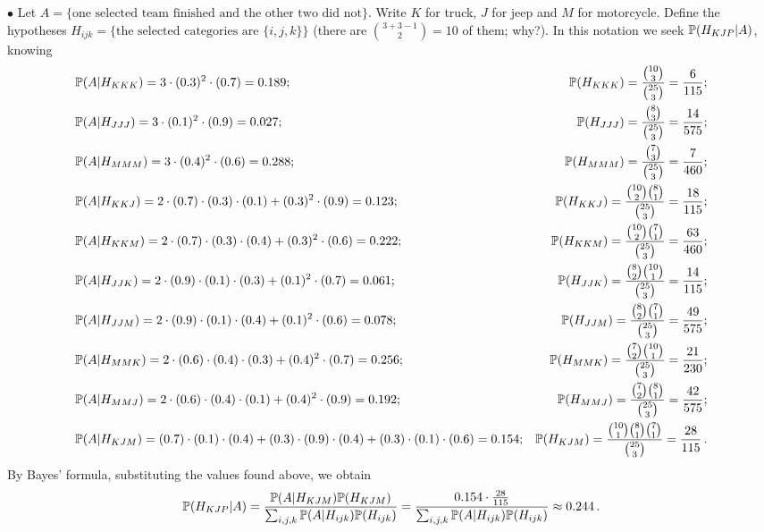 \documentclass[a4paper]{report}
\begin{document}
$\bullet$ Let $A=\{\text{one selected team finished and the other two did not}\}$.
Write $K$ for truck, $J$ for jeep and $M$ for motorcycle. Define the hypotheses
$H_{ijk}=\{\text{the selected categories are }\{i,j,k\}\}$ (there are $\binom{3+3-1}{2}=10$ of them; why?). In this notation we seek $\P(H_{KJP}|A)$, knowing
\begingroup\small
\begin{align*}
   &\P(A|H_{KKK}) = 3 \cdot (0.3)^2 \cdot (0.7) = 0.189;  &\P(H_{KKK}) =
   \frac{\binom{10}{3}}{\binom{25}{3}} = \frac{6}{115};\\%
   &\P(A|H_{JJJ}) = 3 \cdot (0.1)^2  \cdot (0.9)= 0.027; &\P(H_{JJJ}) =
   \frac{\binom{8}{3}}{\binom{25}{3}}= \frac{14}{575};\\%
   &\P(A|H_{MMM}) = 3 \cdot (0.4)^2 \cdot (0.6) = 0.288; &\P(H_{MMM}) =\frac{\binom{7}{3}}{\binom{25}{3}}= \frac{7}{460};\\
   &\P(A|H_{KKJ}) = 2\cdot(0.7)\cdot(0.3)\cdot(0.1)
   + (0.3)^2\cdot(0.9) = 0.123; &\P(H_{KKJ}) = \frac{\binom{10}{2}\binom{8}{1}}{\binom{25}{3}}
   =\frac{18}{115}; \\
      &\P(A|H_{KKM}) = 2\cdot(0.7)\cdot(0.3)\cdot(0.4)
   + (0.3)^2\cdot(0.6)=0.222; &\P(H_{KKM}) = \frac{\binom{10}{2}\binom{7}{1}}{\binom{25}{3}}
   = \frac{63}{460}; \\
      &\P(A|H_{JJK}) = 2\cdot(0.9)\cdot(0.1)\cdot(0.3)
   + (0.1)^2\cdot(0.7)=0.061; &\P(H_{JJK}) = \frac{\binom{8}{2}\binom{10}{1}}{\binom{25}{3}}=
   \frac{14}{115};  \\
      &\P(A|H_{JJM}) = 2\cdot(0.9)\cdot(0.1)\cdot(0.4)
   + (0.1)^2\cdot(0.6)=0.078; &\P(H_{JJM}) = \frac{\binom{8}{2}\binom{7}{1}}{\binom{25}{3}}
   =\frac{49}{575}; \\
      &\P(A|H_{MMK}) = 2\cdot(0.6)\cdot(0.4)\cdot(0.3)
   + (0.4)^2\cdot(0.7)=0.256; &\P(H_{MMK}) = \frac{\binom{7}{2}\binom{10}{1}}{\binom{25}{3}}
   = \frac{21}{230};  \\
         &\P(A|H_{MMJ}) = 2\cdot(0.6)\cdot(0.4)\cdot(0.1)
   + (0.4)^2\cdot(0.9) = 0.192; &\P(H_{MMJ}) = \frac{\binom{7}{2}\binom{8}{1}}{\binom{25}{3}}
   = \frac{42}{575};\\
      &\P(A|H_{KJM}) = (0.7)\cdot(0.1)\cdot(0.4) + (0.3)\cdot(0.9)\cdot(0.4) +
      (0.3)\cdot(0.1)\cdot(0.6) =0.154
; &\P(H_{KJM}) = \frac{\binom{10}{1}\binom{8}{1}\binom{7}{1}}{\binom{25}{3}} =\frac{28}{115} \,.
\end{align*}
\endgroup
By Bayes' formula, substituting the values found above, we obtain
\[
\P(H_{KJP}|A) = \frac{\P(A|H_{KJM})\P(H_{KJM})}{\sum_{i,j,k}\P(A|H_{ijk})\P(H_{ijk})}
= \frac{0.154\cdot\frac{28}{115}}{\sum_{i,j,k}\P(A|H_{ijk})\P(H_{ijk})} \approx 0.244 \, .
\]
\end{document}
